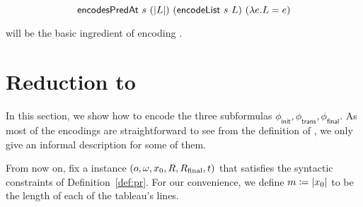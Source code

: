 \begin{proposition}
  \[\textsf{encodesPredAt}~s~(|L|)~(\textsf{encodeList}~s~L)~(\lambda e. L = e) \]
\end{proposition}

\encodeList{} will be the basic ingredient of encoding \PR{}. 

\section{Reduction to \fsat{}}
In this section, we show how to encode the three subformulas $\phi_{\textsf{init}}, \phi_{\textsf{trans}}, \phi_{\textsf{final}}$. 
As most of the encodings are straightforward to see from the definition of \PR{}, we only give an informal description for some of them. 

From now on, fix a \BPR{} instance $(o, \omega, x_0, R, R_{\text{final}}, t)$ that satisfies the syntactic constraints of Definition~\ref{def:pr}.
For our convenience, we define $m \coloneqq |x_0|$ to be the length of each of the tableau's lines. 

